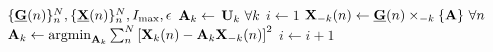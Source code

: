 \begin{algorithmic}[1]
	\Require $\{\underline{\mathbf{G}}(n)\}_n^N,\{\underline{\mathbf{X}}(n)\}_n^N,I_\text{max}, \epsilon$
	\State $\mathbf{A}_k \gets $ $\mathbf{U}_k \ \forall k$
	\State $i\gets 1$
	\Repeat
	\State $\mat{X}_{-k}(n)\gets\ten{G}(n)\mmprsi{\mat{A}}{k} \ \forall n$
	\State
	$\mathbf{A}_k\gets\textstyle{\mathop{\mathrm{argmin}}_{\mathbf{A}_k}\sum_n^N}\left[\mathbf{X}_k(n)-\mathbf{A}_k\mathbf{X}_{-k}(n)\right]^2$
	\EndFor
	\State $i\gets i+1$
\end{algorithmic}
